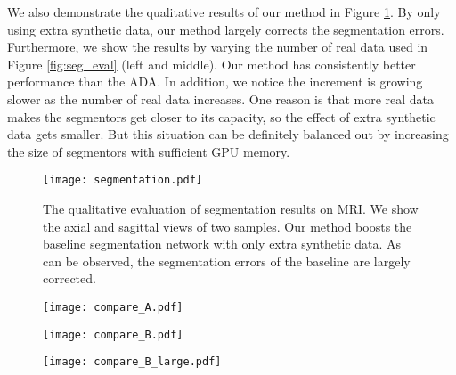 \documentclass[10pt,twocolumn,letterpaper]{article}
\begin{document}
We also demonstrate the qualitative results of our method in Figure \ref{fig:segmentation}. By only using extra synthetic data, our method largely corrects the segmentation errors.
Furthermore, we show the results by varying the number of real data used in Figure \ref{fig:seg_eval} (left and middle). Our method has consistently better performance than the ADA. In addition, we notice the increment is growing slower as the number of real data increases. One reason is that more real data makes the segmentors get closer to its capacity, so the effect of extra synthetic data gets smaller. But this situation can be definitely balanced out by increasing the size of segmentors with sufficient GPU memory.  


\begin{figure}[t]
	\begin{center}
		\texttt{[image: segmentation.pdf]}
	\end{center}
	\vspace{-.2cm}
	\caption{The qualitative evaluation of segmentation results on MRI. We show the axial and sagittal views of two samples. Our method boosts the baseline segmentation network with only extra synthetic data. As can be observed, the segmentation errors of the baseline are largely corrected. } \label{fig:segmentation}
\end{figure}
\begin{figure*}[t]	
	\begin{center}
		\begin{subfigure}[b]{0.33\textwidth}
			\centering
			\texttt{[image: compare\_A.pdf]}
		\end{subfigure}
		\begin{subfigure}[b]{0.33\textwidth}
			\centering
			\texttt{[image: compare\_B.pdf]}
		\end{subfigure}
		\begin{subfigure}[b]{0.33\textwidth}
			\centering
			\texttt{[image: compare\_B\_large.pdf]}
		\end{subfigure}
		
	\end{center}
	\vspace{-.4cm}
	\caption{The segmentation accuracy (mean Dice score) comparison to demonstrate the effectiveness of our method of using \textbf{S}ynthetic data to boost segmentation. The left plot shows the segmentation accuracy by varying the percentage of \textbf{R}eal data used for training segmentation on CT using dataset $\mathbf{S}_1$, using a equal number of synthetic data. Baseline (R) is trained with only real data. Others are trained from it, e.g. ADA (R+S) is trained by adding only \textbf{S} data. The middle plot shows the same experiments on MRI. The right plot shows results by varying the number of synthetic data on MRI using dataset $\mathbf{S}_2$ using a equal number of real data. Our method has consistently better performance. See text for details about comparing methods. \vspace{-.4cm}} \label{fig:seg_eval} 
\end{figure*}
\end{document}
